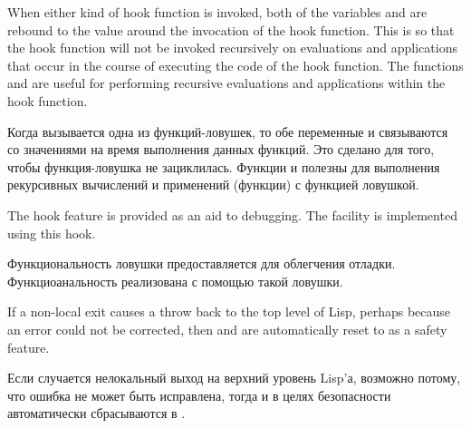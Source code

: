 \begin{defun}[Variable]
When either kind of hook function is invoked, both of the variables
and  are rebound to the value {\nil} around the invocation
of the hook function.  This is so that the hook function will not be
invoked recursively on evaluations and applications that occur
in the course of executing the code of the hook function.
The functions 
and  are useful for performing recursive evaluations
and applications within the hook function.

Когда вызывается одна из функций-ловушек, то обе переменные  и
 связываются со значениями {\nil} на время выполнения данных
функций. Это сделано для того, чтобы функция-ловушка не зациклилась.
Функции  и  полезны для выполнения рекурсивных
вычислений и применений (функции) с функцией ловушкой.

The hook feature is provided as an aid to debugging.
The  facility is implemented using this hook.

Функциональность ловушки предоставляется для облегчения отладки.
Функциоанальность  реализована с помощью такой ловушки.

If a non-local exit causes a throw back to the top level
of Lisp, perhaps because an error could not
be corrected, then  and  are
automatically reset to {\false} as a safety feature.

Если случается нелокальный выход на верхний уровень Lisp'а, возможно потому, что
ошибка не может быть исправлена, тогда  и 
в целях безопасности автоматически сбрасываются в {\false}.
\end{defun}

